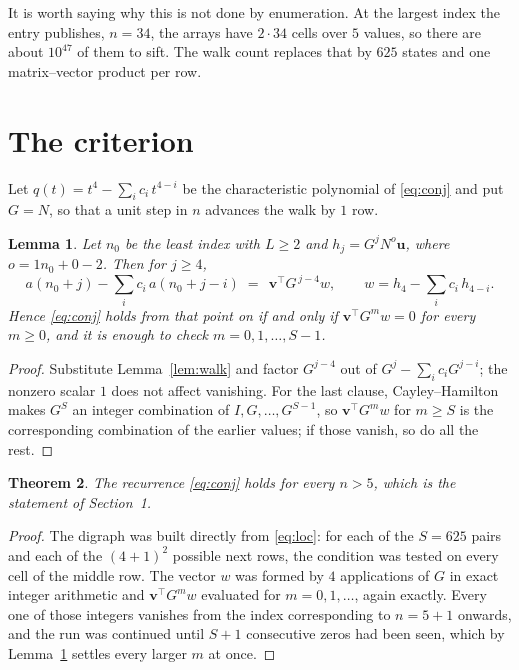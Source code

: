 \documentclass[11pt,a4paper]{article}
\theoremstyle{plain}
\newtheorem{theorem}{Theorem}
\newtheorem{lemma}[theorem]{Lemma}
\theoremstyle{definition}
\begin{document}
It is worth saying why this is not done by enumeration. At the largest index the entry
publishes, $n=34$, the arrays have $2\cdot34$ cells over
$5$ values, so there are about $10^{47}$ of them to sift. The
walk count replaces that by $625$ states and one matrix--vector product per row.
\section{The criterion}

Let $q(t)=t^{4}-\sum_i c_i\,t^{4-i}$ be the characteristic polynomial of
\eqref{eq:conj} and put $G=N$, so that a unit step in $n$ advances the walk by
$1$ row.

\begin{lemma}\label{lem:crit}
Let $n_0$ be the least index with $L\ge2$ and $h_j=G^{j}N^{o}\mathbf{u}$, where
$o=1n_0+0-2$. Then for $j\ge4$,
\[
a(n_0+j)-\sum_i c_i\,a(n_0+j-i)\;=\;\,\mathbf{v}^{\!\top}G^{\,j-4}w,
\qquad w=h_{4}-\sum_i c_i\,h_{4-i} .
\]
Hence \eqref{eq:conj} holds from that point on if and only if
$\mathbf{v}^{\!\top}G^{m}w=0$ for every $m\ge0$, and it is enough to check
$m=0,1,\dots,S-1$.
\end{lemma}

\begin{proof}
Substitute Lemma~\ref{lem:walk} and factor $G^{j-4}$ out of
$G^{j}-\sum_ic_iG^{j-i}$; the nonzero scalar $1$ does not affect
vanishing. For the last clause, Cayley--Hamilton makes $G^{S}$ an integer combination of
$I,G,\dots,G^{S-1}$, so $\mathbf{v}^{\!\top}G^{m}w$ for $m\ge S$ is the corresponding
combination of the earlier values; if those vanish, so do all the rest.
\end{proof}

\begin{theorem}
The recurrence \eqref{eq:conj} holds for every $n>5$, which is the statement of
Section~1.
\end{theorem}

\begin{proof}
The digraph was built directly from \eqref{eq:loc}: for each of the $S=625$ pairs and each
of the $(4+1)^{2}$ possible next rows, the condition was tested on every cell of
the middle row. The vector $w$ was formed by $4$ applications of $G$ in exact integer
arithmetic and $\mathbf{v}^{\!\top}G^{m}w$ evaluated for $m=0,1,\dots$, again exactly.
Every one of those integers vanishes from the index corresponding to $n=5+1$ onwards,
and the run was continued until $S+1$ consecutive zeros had been seen, which by
Lemma~\ref{lem:crit} settles every larger $m$ at once.
\end{proof}
\end{document}
